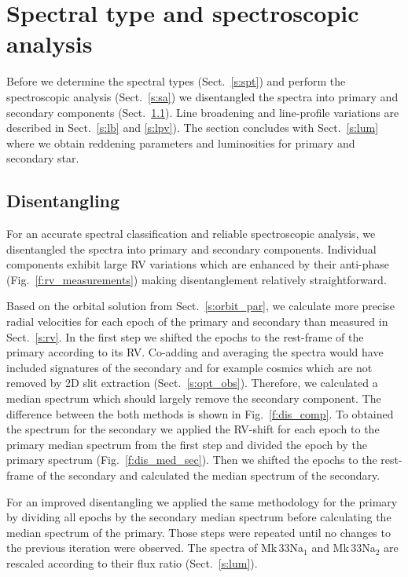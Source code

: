 \documentclass[fleqn,usenatbib]{mnras}
\begin{document}
\section{Spectral type and spectroscopic analysis}
\label{s:spt_sa} %
Before we determine the spectral types (Sect.~\ref{s:spt}) and perform the spectroscopic analysis (Sect.~\ref{s:sa}) we disentangled the spectra into primary and secondary components (Sect.~\ref{s:dis}). Line broadening and line-profile variations are described in Sect.~\ref{s:lb} and \ref{s:lpv}). The section concludes with Sect.~\ref{s:lum} where we obtain reddening parameters and luminosities for primary and secondary star. 

\subsection{Disentangling}\label{s:dis}

For an accurate spectral classification and reliable spectroscopic analysis, we disentangled the spectra into primary and  secondary components. Individual components exhibit large RV variations which are enhanced by their anti-phase (Fig.~\ref{f:rv_measurements}) making disentanglement relatively straightforward. 

Based on the orbital solution from Sect.~\ref{s:orbit_par}, we calculate more precise radial velocities for each epoch of the primary and secondary than measured in Sect.~\ref{s:rv}. In the first step we shifted the epochs to the rest-frame of the primary according to its RV. Co-adding and averaging the spectra would have included signatures of the secondary and for example cosmics which are not removed by 2D slit extraction (Sect.~\ref{s:opt_obs}). Therefore, we calculated a median spectrum which should largely remove the secondary component. The difference between the both methods is shown in Fig.~\ref{f:dis_comp}. To obtained the spectrum for the secondary we applied the RV-shift for each epoch to the primary median spectrum from the first step and divided the epoch by the primary spectrum (Fig.~\ref{f:dis_med_sec}). Then we shifted the epochs to the rest-frame of the secondary and calculated the median spectrum of the secondary.

For an improved disentangling we applied the same methodology for the primary by dividing all epochs by the secondary median spectrum before calculating the median spectrum of the primary. Those steps were repeated until no changes to the previous iteration were observed. The spectra of Mk\,33Na$_1$ and Mk\,33Na$_2$ are rescaled according to their flux ratio (Sect.~\ref{s:lum}).
\end{document}
